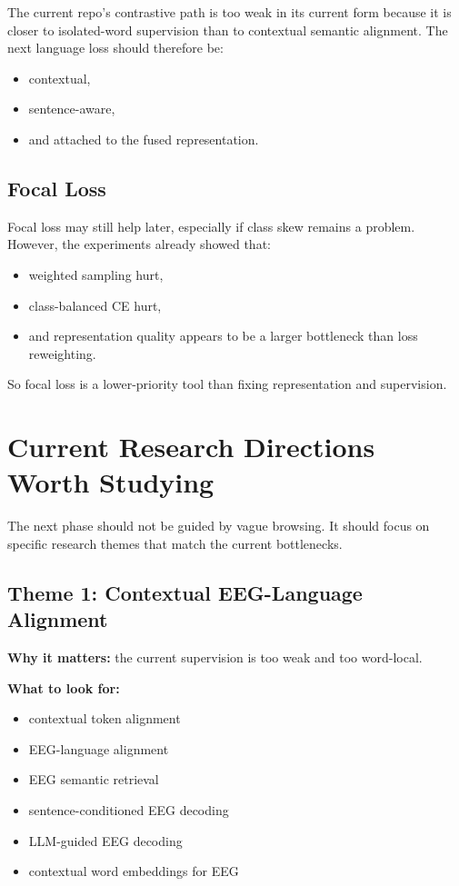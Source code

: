 \documentclass[11pt]{article}
\begin{document}
The current repo's contrastive path is too weak in its current form because it is closer to isolated-word supervision than to contextual semantic alignment. The next language loss should therefore be:
\begin{itemize}
    \item contextual,
    \item sentence-aware,
    \item and attached to the fused representation.
\end{itemize}

\subsection{Focal Loss}

Focal loss may still help later, especially if class skew remains a problem. However, the experiments already showed that:
\begin{itemize}
    \item weighted sampling hurt,
    \item class-balanced CE hurt,
    \item and representation quality appears to be a larger bottleneck than loss reweighting.
\end{itemize}

So focal loss is a lower-priority tool than fixing representation and supervision.

\section{Current Research Directions Worth Studying}

The next phase should not be guided by vague browsing. It should focus on specific research themes that match the current bottlenecks.

\subsection{Theme 1: Contextual EEG-Language Alignment}

\textbf{Why it matters:} the current supervision is too weak and too word-local.

\textbf{What to look for:}
\begin{itemize}
    \item contextual token alignment
    \item EEG-language alignment
    \item EEG semantic retrieval
    \item sentence-conditioned EEG decoding
    \item LLM-guided EEG decoding
    \item contextual word embeddings for EEG
\end{itemize}
\end{document}
